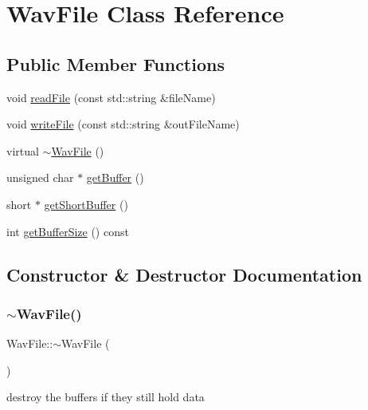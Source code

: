 \hypertarget{classWavFile}{}\section{Wav\+File Class Reference}
\label{classWavFile}
\subsection*{Public Member Functions}
\begin{DoxyCompactItemize}
\item 
void \hyperlink{classWavFile_ac8b9d7fa3bb2d06b6d089089fc48ee5a}{read\+File} (const std\+::string \&file\+Name)
\item 
void \hyperlink{classWavFile_ab057c127fb35388e9a49e5b37b9088ad}{write\+File} (const std\+::string \&out\+File\+Name)
\item 
virtual \hyperlink{classWavFile_ad21c277f6ba3cc6e8ce1b3fe92f3243d}{$\sim$\+Wav\+File} ()
\item 
unsigned char $\ast$ \hyperlink{classWavFile_afaf8f58b0c3732079644a366b39f5c28}{get\+Buffer} ()
\item 
short $\ast$ \hyperlink{classWavFile_ad8f9daefb75a9467c499eb27b4e3ec73}{get\+Short\+Buffer} ()
\item 
int \hyperlink{classWavFile_aced9840645cf59cffc1c96f0d44575fe}{get\+Buffer\+Size} () const
\end{DoxyCompactItemize}


\subsection{Constructor \& Destructor Documentation}
\mbox{\label{classWavFile_ad21c277f6ba3cc6e8ce1b3fe92f3243d}} 
\subsubsection{\texorpdfstring{$\sim$\+Wav\+File()}{~WavFile()}}
{\footnotesize\ttfamily Wav\+File\+::$\sim$\+Wav\+File (\begin{DoxyParamCaption}{ }\end{DoxyParamCaption})\hspace{0.3cm}{\ttfamily [virtual]}}

destroy the buffers if they still hold data 

